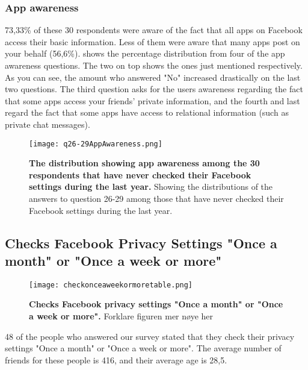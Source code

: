 \subsubsection{App awareness}
73,33\% of these 30 respondents were aware of the fact that all apps on Facebook access their basic information. Less of them were aware that many apps post on your behalf (56,6\%).  shows the percentage distribution from four of the app awareness questions. The two on top shows the ones just mentioned respectively. As you can see, the amount who answered "No" increased drastically on the last two questions. The third question asks for the users awareness regarding the fact that some apps access your friends' private information, and the fourth and last regard the fact that some apps have access to relational information (such as private chat messages). 

\begin{figure}[h!]
\centering
\texttt{[image: q26-29AppAwareness.png]}
\caption[The distribution showing app awareness among the 30 respondents that have never checked their Facebook settings during the last year]{\textbf{The distribution showing app awareness among the 30 respondents that have never checked their Facebook settings during the last year.} Showing the distributions of the answers to question 26-29 among those that have never checked their Facebook settings during the last year.} 
\label{fig:appawarenessneverchecked}
\end{figure}


\subsection{Checks Facebook Privacy Settings "Once a month" or "Once a week or more"}

\begin{figure}[h!]
\centering
\texttt{[image: checkonceaweekormoretable.png]}
\caption[Checks Facebook privacy settings "Once a month" or "Once a week or more"]{\textbf{Checks Facebook privacy settings "Once a month" or "Once a week or more".} Forklare figuren mer nøye her} 
\label{fig:onceaweekormore}
\end{figure}

48 of the people who answered our survey stated that they check their privacy settings "Once a month" or "Once a week or more". The average number of friends for these people is 416, and their average age is 28,5. 

